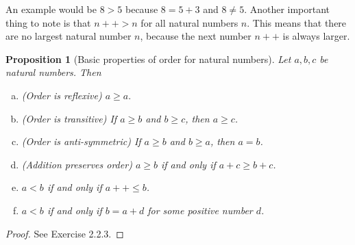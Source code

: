 \documentclass[a4paper, twocolumn]{report}
\newcounter{dummy} \numberwithin{dummy}{section}
\newtheorem{prp}[dummy]{Proposition}
\theoremstyle{definition}
\theoremstyle{solution}
\newcommand{\dplus}{{+}{+}} %
\begin{document}
An example would be $8 > 5$ because $ 8 = 5 + 3$ and $ 8 \neq 5$.  Another
important thing to note is that $n\dplus > n$ for all natural numbers $n$.
This means that there are no largest natural number $n$, because the next
number $n\dplus$ is always larger.

\begin{prp}[Basic properties of order for natural numbers]
  \label{prp_2212}
  Let $a, b, c$ be natural numbers. Then
  \begin{enumerate}[(a)]
    \item 
      (Order is reflexive) $a\geq a.$
    \item 
      (Order is transitive) If $a \geq b$ and $b \geq c$, then $a \geq c$.
    \item 
      (Order is anti-symmetric) If $a \geq b$ and $b \geq a$, then $a = b$.
    \item
      (Addition preserves order) $a \geq b$ if and only if $a + c \geq b + c$.
    \item
      $ a < b $ if and only if $ a\dplus \leq b$.
    \item 
      $a < b$ if and only if $ b = a + d$ for some \textrm{positive} number $d$.
  \end{enumerate}
\end{prp}
\begin{proof}
  See Exercise 2.2.3.
\end{proof}
\end{document}
